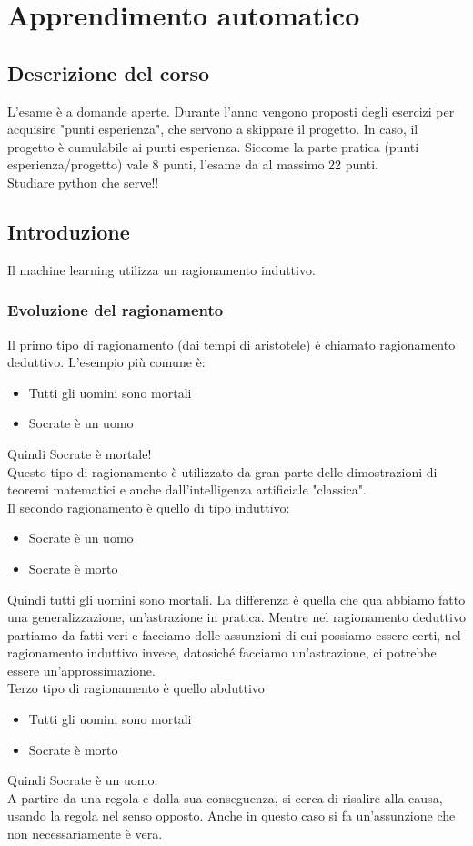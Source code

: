 \section{Apprendimento automatico}\label{apprendimento-automatico}
\subsection{Descrizione del corso}
L'esame è a domande aperte. Durante l'anno vengono proposti degli esercizi per acquisire "punti esperienza", che servono a skippare il progetto.
In caso, il progetto è cumulabile ai punti esperienza. Siccome la parte pratica (punti esperienza/progetto) vale 8 punti, l'esame da al massimo 22 punti.
\\ Studiare python che serve!!

\subsection{Introduzione}
Il machine learning utilizza un ragionamento induttivo.
\subsubsection{Evoluzione del ragionamento}
Il primo tipo di ragionamento (dai tempi di aristotele) è chiamato ragionamento deduttivo. L'esempio più comune è:
\begin{itemize}
  \item Tutti gli uomini sono mortali
  \item Socrate è un uomo
\end{itemize}
Quindi Socrate è mortale!
\\
Questo tipo di ragionamento è utilizzato da gran parte delle dimostrazioni di teoremi matematici e anche dall'intelligenza artificiale "classica".
\\
Il secondo ragionamento è quello di tipo induttivo:
\begin{itemize}
  \item Socrate è un uomo
  \item Socrate è morto
\end{itemize}
Quindi tutti gli uomini sono mortali. La differenza è quella che qua abbiamo fatto una generalizzazione, un'astrazione in pratica. Mentre nel ragionamento
deduttivo partiamo da fatti veri e facciamo delle assunzioni di cui possiamo essere certi, nel ragionamento induttivo invece, datosiché facciamo un'astrazione,
ci potrebbe essere un'approssimazione.
\\
Terzo tipo di ragionamento è quello abduttivo
\begin{itemize}
  \item Tutti gli uomini sono mortali
  \item Socrate è morto
\end{itemize}
Quindi Socrate è un uomo.\\
A partire da una regola e dalla sua conseguenza, si cerca di risalire alla causa, usando la regola nel senso opposto. Anche in questo caso si fa un'assunzione
che non necessariamente è vera.

